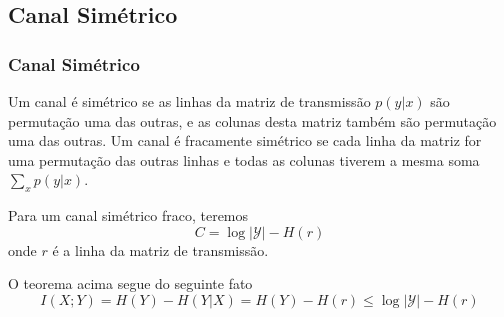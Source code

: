\subsection{Canal Simétrico}
\begin{frame}[allowframebreaks]
  \frametitle{Canal Simétrico}

  \begin{definition}
  Um canal é simétrico se as linhas da matriz de transmissão $p(y|x)$ são permutação uma das outras,
  e as colunas desta matriz também são permutação uma das outras. Um canal é fracamente simétrico
  se cada linha da matriz for uma permutação das outras linhas e todas as colunas tiverem a mesma
  soma $\sum_x p(y|x)$.
  \end{definition}

  \begin{theorem}
  Para um canal simétrico fraco, teremos
	\begin{equation}
	C = \log \vert \mathcal{Y} \vert - H(r)
	\end{equation}
  onde $r$ é a linha da matriz de transmissão. 
  \end{theorem}
  O teorema acima segue do seguinte fato
  \begin{equation}
  I(X;Y) = H(Y) - H(Y|X) = H(Y) - H(r) \leq \log \vert \mathcal{Y} \vert - H(r)
  \end{equation}

\end{frame}


